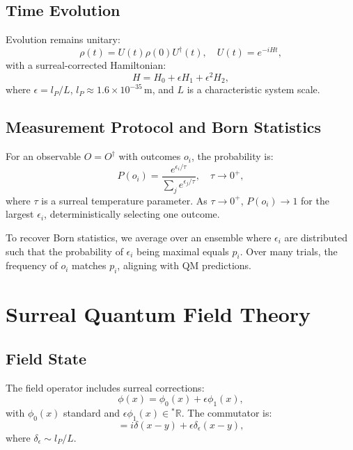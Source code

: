\documentclass{article}
\begin{document}
\subsection{Time Evolution}
Evolution remains unitary:
\begin{equation}
\rho(t) = U(t) \rho(0) U^\dagger(t), \quad U(t) = e^{-i H t},
\end{equation}
with a surreal-corrected Hamiltonian:
\begin{equation}
H = H_0 + \epsilon H_1 + \epsilon^2 H_2,
\end{equation}
where \(\epsilon = l_P / L\), \(l_P \approx 1.6 \times 10^{-35} \, \text{m}\), and \(L\) is a characteristic system scale.

\subsection{Measurement Protocol and Born Statistics}
For an observable \(O = O^\dagger\) with outcomes \(o_i\), the probability is:
\begin{equation}
P(o_i) = \frac{e^{\epsilon_i / \tau}}{\sum_j e^{\epsilon_j / \tau}}, \quad \tau \to 0^+,
\end{equation}
where \(\tau\) is a surreal temperature parameter. As \(\tau \to 0^+\), \(P(o_i) \to 1\) for the largest \(\epsilon_i\), deterministically selecting one outcome.

To recover Born statistics, we average over an ensemble where \(\epsilon_i\) are distributed such that the probability of \(\epsilon_i\) being maximal equals \(p_i\). Over many trials, the frequency of \(o_i\) matches \(p_i\), aligning with QM predictions.

\section{Surreal Quantum Field Theory}
\subsection{Field State}
The field operator includes surreal corrections:
\begin{equation}
\phi(x) = \phi_0(x) + \epsilon \phi_1(x),
\end{equation}
with \(\phi_0(x)\) standard and \(\epsilon \phi_1(x) \in {}^*\mathbb{R}\). The commutator is:
\begin{equation}
[\phi(x), \pi(y)] = i \delta(x-y) + \epsilon \delta_\epsilon(x-y),
\end{equation}
where \(\delta_\epsilon \sim l_P / L\).
\end{document}
